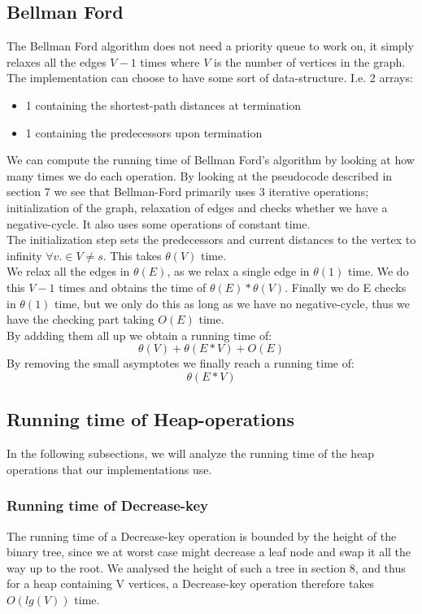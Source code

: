 \documentclass[11pt]{article}
\begin{document}
\subsection{Bellman Ford}
The Bellman Ford algorithm does not need a priority queue to work on, it simply relaxes all the edges $V-1$ times where $V$ is the number of vertices in the graph. The implementation can choose to have some sort of data-structure. I.e. 2 arrays:
\begin{itemize}
\item 1 containing the shortest-path distances at termination
\item 1 containing the predecessors upon termination
\end{itemize}
We can compute the running time of Bellman Ford's algorithm by looking at how many times we do each operation. By looking at the pseudocode described in section 7 we see that Bellman-Ford primarily uses 3 iterative operations; initialization of the graph, relaxation of edges and checks whether we have a negative-cycle. It also uses some operations of constant time.\\

\noindent The initialization step sets the predecessors and current distances to the vertex to infinity $\forall v. \in V \neq s$. This takes $\theta(V)$ time.\\ 

\noindent We relax all the edges in $\theta(E)$, as we relax a single edge in $\theta(1)$ time. We do this $V-1$ times and obtains the time of $\theta(E) * \theta(V)$. Finally we do E checks in $\theta(1)$ time, but we only do this as long as we have no negative-cycle, thus we have the checking part taking $O(E)$ time.\\ 

\noindent By addding them all up we obtain a running time of:\\
$$\theta(V) + \theta(E*V) + O(E)$$
By removing the small asymptotes we finally reach a running time of:\\
$$\theta(E*V)$$

\newpage
\subsection{Running time of Heap-operations}
In the following subsections, we will analyze the running time of the heap operations that our implementations use.

\subsubsection{Running time of Decrease-key}
The running time of a Decrease-key operation is bounded by the height of the binary tree, since we at worst case might decrease a leaf node and swap it all the way up to the root. We analysed the height of such a tree in section 8, and thus for a heap containing V vertices, a Decrease-key operation therefore takes $O(lg(V))$ time.
\end{document}
